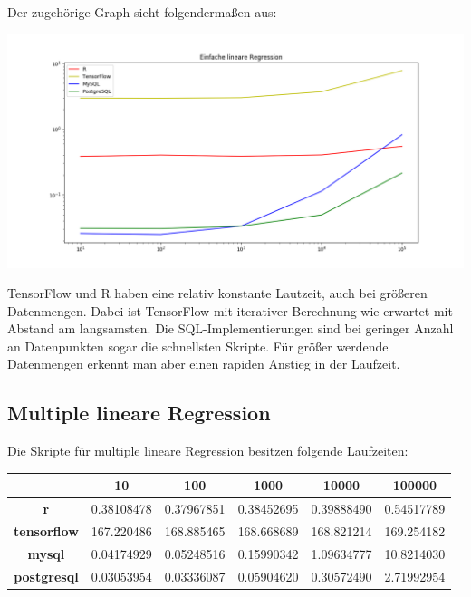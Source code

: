 Der zugehörige Graph sieht folgendermaßen aus:

\includegraphics[width=\textwidth]{simpleLinearRegressionBenchmark}

TensorFlow und R haben eine relativ konstante Lautzeit, auch bei größeren Datenmengen. Dabei ist TensorFlow mit iterativer Berechnung wie erwartet mit Abstand am langsamsten. Die SQL-Implementierungen sind bei geringer Anzahl an Datenpunkten sogar die schnellsten Skripte. Für größer werdende Datenmengen erkennt man aber einen rapiden Anstieg in der Laufzeit.

\subsection{Multiple lineare Regression}
\label{subsection:4:1:2}

Die Skripte für multiple lineare Regression besitzen folgende Laufzeiten:

\begin{center}
  \begin{tabular}{|c|c|c|c|c|c|}\hline
    & \textbf{10} & \textbf{100} & \textbf{1000} & \textbf{10000} & \textbf{100000} \\ \hline
    \textbf{r} & 0.38108478 & 0.37967851 & 0.38452695 & 0.39888490 & 0.54517789 \\ \hline
    \textbf{tensorflow} & 167.220486 & 168.885465 & 168.668689 & 168.821214 & 169.254182 \\ \hline
    \textbf{mysql} & 0.04174929 & 0.05248516 & 0.15990342 & 1.09634777 & 10.8214030 \\ \hline
    \textbf{postgresql} & 0.03053954 & 0.03336087 & 0.05904620 & 0.30572490 & 2.71992954 \\ \hline
  \end{tabular}
\end{center}

